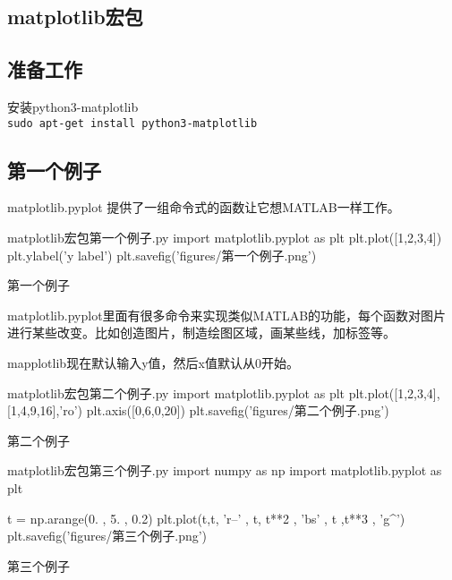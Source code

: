 \documentclass[11pt,oneside]{book}
\begin{document}
\begin{common-format}
\mainmatter


\chapter{matplotlib宏包}
\section{准备工作}
安装python3-matplotlib\\
\verb+sudo apt-get install python3-matplotlib+

\section{第一个例子}
matplotlib.pyplot 提供了一组命令式的函数让它想MATLAB一样工作。
\begin{xverbatim}[129]{matplotlib宏包第一个例子.py}
import matplotlib.pyplot as plt
plt.plot([1,2,3,4])
plt.ylabel('y label')
plt.savefig('figures/第一个例子.png')
\end{xverbatim}

\begin{linefig}{第一个例子}
\end{linefig}

matplotlib.pyplot里面有很多命令来实现类似MATLAB的功能，每个函数对图片进行某些改变。比如创造图片，制造绘图区域，画某些线，加标签等。

mapplotlib现在默认输入y值，然后x值默认从0开始。

\begin{xverbatim}[129]{matplotlib宏包第二个例子.py}
import matplotlib.pyplot as plt
plt.plot([1,2,3,4],[1,4,9,16],'ro')
plt.axis([0,6,0,20])
plt.savefig('figures/第二个例子.png')
\end{xverbatim}

\begin{linefig}{第二个例子}
\end{linefig}

\begin{xverbatim}[129]{matplotlib宏包第三个例子.py}
import numpy as np
import matplotlib.pyplot as plt

t = np.arange(0. , 5. , 0.2)
plt.plot(t,t, 'r--' , t, t**2 , 'bs' , t ,t**3 , 'g^')
plt.savefig('figures/第三个例子.png')
\end{xverbatim}

\begin{linefig}{第三个例子}
\end{linefig}



\end{common-format}
\end{document}
